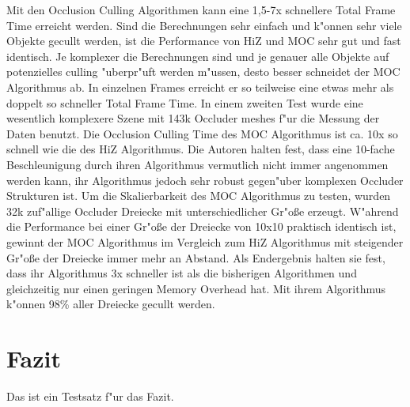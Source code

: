 \documentclass[journal]{vgtc}
\begin{document}
Mit den Occlusion Culling Algorithmen kann eine 1,5-7x schnellere Total Frame Time erreicht werden.
Sind die Berechnungen sehr einfach und k"onnen sehr viele Objekte gecullt werden, ist die Performance von HiZ und MOC sehr gut und fast identisch.
Je komplexer die Berechnungen sind und je genauer alle Objekte auf potenzielles culling "uberpr"uft werden m"ussen, desto besser schneidet der MOC Algorithmus ab.
In einzelnen Frames erreicht er so teilweise eine etwas mehr als doppelt so schneller Total Frame Time.
In einem zweiten Test wurde eine wesentlich komplexere Szene mit 143k Occluder meshes f"ur die Messung der Daten benutzt.
Die Occlusion Culling Time des MOC Algorithmus ist ca. 10x so schnell wie die des HiZ Algorithmus.
Die Autoren halten fest, dass eine 10-fache Beschleunigung durch ihren Algorithmus vermutlich nicht immer angenommen werden kann, ihr Algorithmus jedoch sehr robust gegen"uber komplexen Occluder Strukturen ist.
Um die Skalierbarkeit des MOC Algorithmus zu testen, wurden 32k zuf"allige Occluder Dreiecke mit unterschiedlicher Gr"o\ss{}e erzeugt.
W"ahrend die Performance bei einer Gr"o\ss{}e der Dreiecke von 10x10 praktisch identisch ist, gewinnt der MOC Algorithmus im Vergleich zum HiZ Algorithmus mit steigender Gr"o\ss{}e der Dreiecke immer mehr an Abstand.
Als Endergebnis halten sie fest, dass ihr Algorithmus 3x schneller ist als die bisherigen Algorithmen und gleichzeitig nur einen geringen Memory Overhead hat.
Mit ihrem Algorithmus k"onnen 98\% aller Dreiecke gecullt werden.


\section{Fazit}
Das ist ein Testsatz f"ur das Fazit.

 

\end{document}
